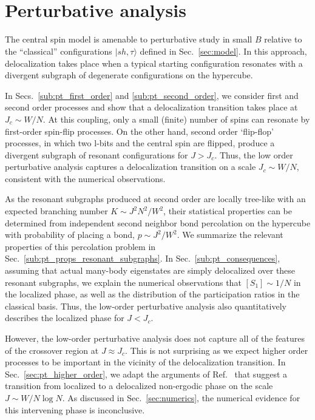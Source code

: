 \documentclass[aps,pra,twocolumn,a4paper,showpacs,superscriptaddress,floatfix,10pt]{revtex4}
\newcommand{\ket}[1]{|#1\rangle}
\begin{document}

\section{Perturbative analysis}
\label{sec:perturbative_analysis}
The central spin model is amenable to perturbative study in small $B$ relative to the ``classical'' configurations $\ket{s \hat{h}, \tau}$ defined in Sec.~\ref{sec:model}.
In this approach, delocalization takes place when a typical starting configuration resonates with a divergent subgraph of degenerate configurations on the hypercube.

In Secs.~\ref{sub:pt_first_order} and \ref{sub:pt_second_order}, we consider first and second order processes and show that a delocalization transition takes place at $J_c \sim W/N$.
At this coupling, only a small (finite) number of spins can resonate by first-order spin-flip processes.
On the other hand, second order `flip-flop' processes, in which two l-bits and the central spin are flipped, produce a divergent subgraph of resonant configurations for $J > J_c$.
Thus, the low order perturbative analysis captures a delocalization transition on a scale $J_c \sim W/N$, consistent with the numerical observations.

As the resonant subgraphs produced at second order are locally tree-like with an expected branching number $K \sim J^2N^2/W^2$, their statistical properties can be determined from independent second neighbor bond percolation on the hypercube with probability of placing a bond, $p\sim J^2/W^2$.
We summarize the relevant properties of this percolation problem in Sec.~\ref{sub:pt_props_resonant_subgraphs}.
In Sec.~\ref{sub:pt_consequences}, assuming that actual many-body eigenstates are simply delocalized over these resonant subgraphs, we explain the numerical observations that $[S_1] \sim 1/N$ in the localized phase, as well as the distribution of the participation ratios in the classical basis.
Thus, the low-order perturbative analysis also quantitatively describes the localized phase for $J < J_c$.

However, the low-order perturbative analysis does not capture all of the features of the crossover region at $ J \approx J_c$.
This is not surprising as we expect higher order processes to be important in the vicinity of the delocalization transition.
In Sec.~\ref{sec:pt_higher_order}, we adapt the arguments of Ref.~\cite{Altshuler:1997aa} that suggest a transition from localized to a delocalized non-ergodic phase on the scale $J \sim W / N \log N$.
As discussed in Sec.~\ref{sec:numerics}, the numerical evidence for this intervening phase is inconclusive.
\end{document}
